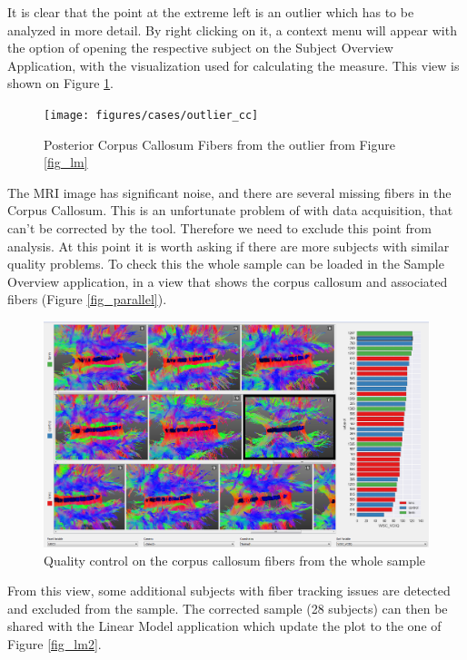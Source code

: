 \documentclass[twocolumn]{svjour3}
\begin{document}
It is clear that the point at the extreme left is an outlier which has to be analyzed in more detail. By right clicking on it, a context menu will appear with the option of opening the respective subject on the Subject Overview Application, with the visualization used for calculating the measure. This view is shown on Figure \ref{fig_subject2}.

\begin{figure}
\begin{center}
\texttt{[image: figures/cases/outlier\_cc]}
\end{center}
 \caption{\label{fig_subject2} Posterior Corpus Callosum Fibers from the outlier from Figure \ref{fig_lm}}
\end{figure}


The MRI image has significant noise, and there are several missing fibers in the Corpus Callosum. This is an unfortunate problem of with data acquisition, that can’t be corrected by the tool. Therefore we need to exclude this point from analysis. At this point it is worth asking if there are more subjects with similar quality problems. To check this the whole sample can be loaded in the Sample Overview application, in a view that shows the corpus callosum and associated fibers (Figure \ref{fig_parallel}).

\begin{figure}
\begin{center}
\includegraphics[width=\linewidth]{figures/cases/quality_control_trim}
\end{center}
 \caption{\label{fig_sample} Quality control on the corpus callosum fibers from the whole sample}
\end{figure}

From this view, some additional subjects with fiber tracking issues are detected and excluded from the sample. The corrected sample (28 subjects) can then be shared with the Linear Model application which update the plot to the one of Figure \ref{fig_lm2}.
\end{document}
